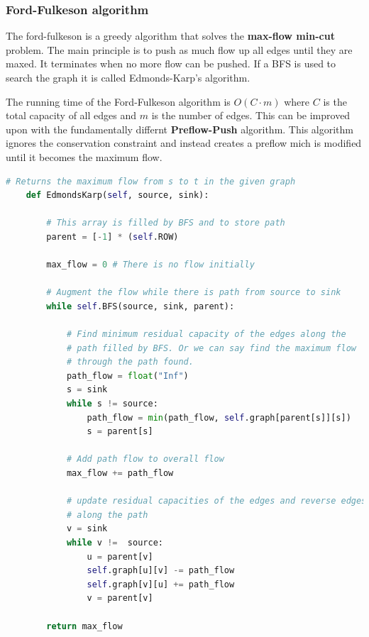 \documentclass[12pt]{article} %
\begin{document}
\subsubsection{Ford-Fulkeson algorithm}
The ford-fulkeson is a greedy algorithm that solves the \textbf{max-flow min-cut} problem. The main principle is to push as much flow up all edges until they are maxed. It terminates when no more flow can be pushed. If a BFS is used to search the graph it is called Edmonds-Karp's algorithm.

\par The running time of the Ford-Fulkeson algorithm is $O(C \cdot m)$ where $C$ is the total capacity of all edges and $m$ is the number of edges. This can be improved upon with the fundamentally differnt \textbf{Preflow-Push} algorithm. This algorithm ignores the conservation constraint and instead creates a preflow mich is modified until it becomes the maximum flow.

\begin{lstlisting}[language=Python, caption=Edmonds-Karp in Python]
# Returns the maximum flow from s to t in the given graph
    def EdmondsKarp(self, source, sink):
 
        # This array is filled by BFS and to store path
        parent = [-1] * (self.ROW)
 
        max_flow = 0 # There is no flow initially
 
        # Augment the flow while there is path from source to sink
        while self.BFS(source, sink, parent):
 
            # Find minimum residual capacity of the edges along the
            # path filled by BFS. Or we can say find the maximum flow
            # through the path found.
            path_flow = float("Inf")
            s = sink
            while s != source:
                path_flow = min(path_flow, self.graph[parent[s]][s])
                s = parent[s]
 
            # Add path flow to overall flow
            max_flow += path_flow
 
            # update residual capacities of the edges and reverse edges
            # along the path
            v = sink
            while v !=  source:
                u = parent[v]
                self.graph[u][v] -= path_flow
                self.graph[v][u] += path_flow
                v = parent[v]
 
        return max_flow
\end{lstlisting}
\end{document}
